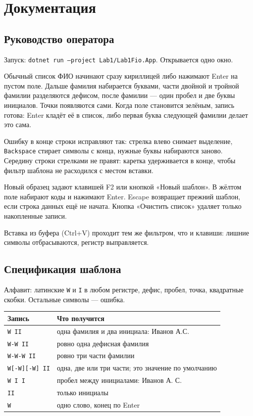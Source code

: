 \documentclass[a4paper,14pt]{extarticle}
\begin{document}
\section{Документация}

\subsection{Руководство оператора}

Запуск: \texttt{dotnet run --project Lab1/Lab1Fio.App}. Открывается одно окно.

Обычный список ФИО начинают сразу кириллицей либо нажимают Enter на пустом поле. Дальше фамилия набирается буквами, части двойной и тройной фамилии разделяются дефисом, после фамилии --- один пробел и две буквы инициалов. Точки появляются сами. Когда поле становится зелёным, запись готова: Enter кладёт её в список, либо первая буква следующей фамилии делает это сама.

Ошибку в конце строки исправляют так: стрелка влево снимает выделение, \texttt{Backspace} стирает символы с конца, нужные буквы набираются заново. Середину строки стрелками не правят: каретка удерживается в конце, чтобы фильтр шаблона не расходился с местом вставки.

Новый образец задают клавишей F2 или кнопкой «Новый шаблон». В жёлтом поле набирают коды и нажимают Enter. Escape возвращает прежний шаблон, если строка данных ещё не начата. Кнопка «Очистить список» удаляет только накопленные записи.

Вставка из буфера (Ctrl+V) проходит тем же фильтром, что и клавиши: лишние символы отбрасываются, регистр выправляется.

\subsection{Спецификация шаблона}

Алфавит: латинские \texttt{W} и \texttt{I} в любом регистре, дефис, пробел, точка, квадратные скобки. Остальные символы --- ошибка.

\begin{center}
\begin{tabular}{p{}p{}}
\toprule
Запись & Что получится\\
\midrule
\texttt{W II} & одна фамилия и два инициала: Иванов А.С.\\
\texttt{W-W II} & ровно одна дефисная фамилия\\
\texttt{W-W-W II} & ровно три части фамилии\\
\texttt{W[-W][-W] II} & одна, две или три части; это значение по умолчанию\\
\texttt{W I I} & пробел между инициалами: Иванов А. С.\\
\texttt{II} & только инициалы\\
\texttt{W} & одно слово, конец по Enter\\
\bottomrule
\end{tabular}
\end{center}
\end{document}

